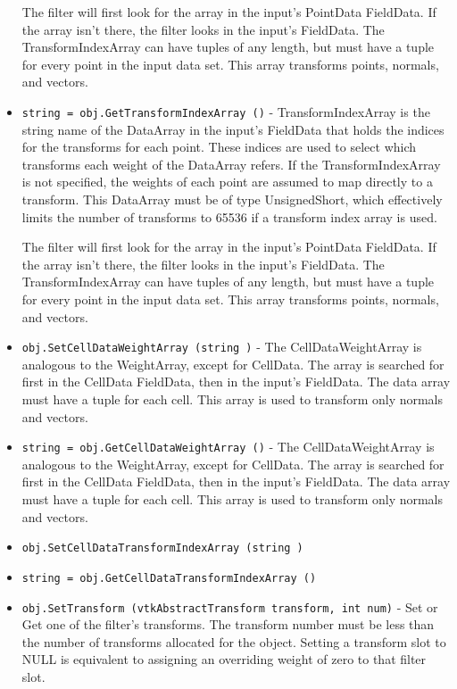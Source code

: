 \begin{itemize}
 The filter will first look for the array in the input's PointData
 FieldData.  If the array isn't there, the filter looks in the
 input's FieldData.  The TransformIndexArray can have tuples of any 
 length, but must have a tuple for every point in the input data set.
 This array transforms points, normals, and vectors.

\item  \verb|string = obj.GetTransformIndexArray ()| -  TransformIndexArray is the string name of the DataArray in the input's
 FieldData that holds the indices for the transforms for each point.
 These indices are used to select which transforms each weight of
 the DataArray refers.  If the TransformIndexArray is not specified,
 the weights of each point are assumed to map directly to a transform.
 This DataArray must be of type UnsignedShort, which effectively
 limits the number of transforms to 65536 if a transform index 
 array is used.
 
 The filter will first look for the array in the input's PointData
 FieldData.  If the array isn't there, the filter looks in the
 input's FieldData.  The TransformIndexArray can have tuples of any 
 length, but must have a tuple for every point in the input data set.
 This array transforms points, normals, and vectors.

\item  \verb|obj.SetCellDataWeightArray (string )| -  The CellDataWeightArray is analogous to the WeightArray, except
 for CellData.  The array is searched for first in the CellData 
 FieldData, then in the input's FieldData.  The data array must have
 a tuple for each cell.  This array is used to transform only normals
 and vectors.

\item  \verb|string = obj.GetCellDataWeightArray ()| -  The CellDataWeightArray is analogous to the WeightArray, except
 for CellData.  The array is searched for first in the CellData 
 FieldData, then in the input's FieldData.  The data array must have
 a tuple for each cell.  This array is used to transform only normals
 and vectors.

\item  \verb|obj.SetCellDataTransformIndexArray (string )|

\item  \verb|string = obj.GetCellDataTransformIndexArray ()|

\item  \verb|obj.SetTransform (vtkAbstractTransform transform, int num)| -  Set or Get one of the filter's transforms. The transform number must
 be less than the number of transforms allocated for the object.  Setting
 a transform slot to NULL is equivalent to assigning an overriding weight
 of zero to that filter slot.


\end{itemize}
